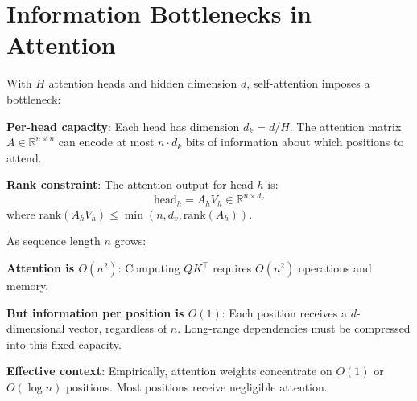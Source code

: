 \section{Information Bottlenecks in Attention}

\begin{remark}
    With $H$ attention heads and hidden dimension $d$, self-attention imposes a bottleneck:

    \textbf{Per-head capacity}: Each head has dimension $d_k = d/H$. The attention matrix $A \in \mathbb{R}^{n \times n}$ can encode at most $n \cdot d_k$ bits of information about which positions to attend.

    \textbf{Rank constraint}: The attention output for head $h$ is:
    \[
        \text{head}_h = A_h V_h \in \mathbb{R}^{n \times d_v}
    \]
    where $\text{rank}(A_h V_h) \leq \min(n, d_v, \text{rank}(A_h))$.
\end{remark}

\begin{remark}
    As sequence length $n$ grows:

    \textbf{Attention is $O(n^2)$}: Computing $QK^\top$ requires $O(n^2)$ operations and memory.

    \textbf{But information per position is $O(1)$}: Each position receives a $d$-dimensional vector, regardless of $n$. Long-range dependencies must be compressed into this fixed capacity.

    \textbf{Effective context}: Empirically, attention weights concentrate on $O(1)$ or $O(\log n)$ positions. Most positions receive negligible attention.
\end{remark}

